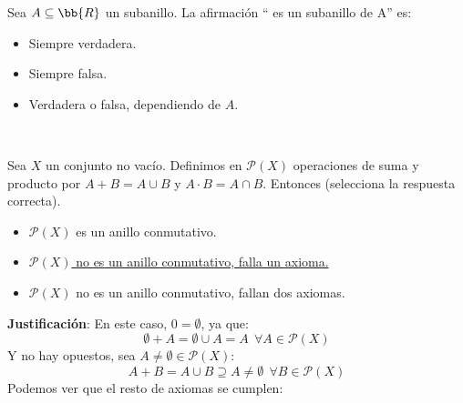 \documentclass[12pt]{article}
\newcounter{ejercicio}[section] %
\newcounter{ejercicio}
\newcommand{\resetearcontador}{%
  \setcounter{ejercicio}{0} %
}
\begin{document}
    \begin{ejercicio}
        Sea $A \subseteq \bb{R}$ un subanillo. La afirmación `` es un subanillo de A'' es:
        \begin{itemize}
            \item Siempre verdadera.
            \item Siempre falsa.
            \item Verdadera o falsa, dependiendo de $A$.
        \end{itemize}
    \end{ejercicio}

    \newpage
    \ %
    \resetearcontador

    \begin{ejercicio}
        Sea $X$ un conjunto no vacío. Definimos en $\mathcal{P}(X)$ operaciones de suma y producto por $A+B = A \cup B$ y $A \cdot B = A \cap B$. Entonces (selecciona la respuesta correcta).
        \begin{itemize}
            \item $\mathcal{P}(X)$ es un anillo conmutativo.
            \item \underline{$\mathcal{P}(X)$ no es un anillo conmutativo, falla un axioma.}
            \item $\mathcal{P}(X)$ no es un anillo conmutativo, fallan dos axiomas.
        \end{itemize}

        \noindent
        \textbf{Justificación}:
        En este caso, $0 = \emptyset$, ya que:
        $$\emptyset + A = \emptyset \cup A = A~~\forall A \in \mathcal{P}(X)$$
        Y no hay opuestos, sea $A\neq \emptyset \in \mathcal{P}(X)$:
        $$A + B = A \cup B \supseteq A \neq \emptyset~~\forall B \in \mathcal{P}(X)$$
        Podemos ver que el resto de axiomas se cumplen:
        

\end{ejercicio}
\end{document}
